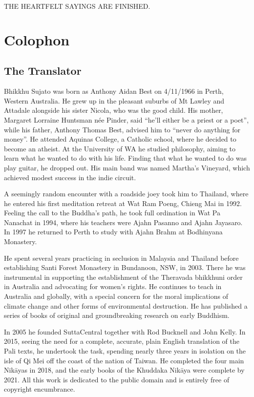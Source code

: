 \documentclass[12pt,openany]{book}%
\newcommand*{\scendbook}[1]{\begin{center}\uppercase{#1}\end{center}}
\let\oldbackmatter\backmatter
\renewcommand{\backmatter}{%
\chapterfont{\setstretch{.85}\normalfont\centering}%
\sectionfont{\setstretch{.85}\Semiboldsubheadfont}%
\oldbackmatter}
\begin{document}
\scendbook{The Heartfelt Sayings are finished. }

%
\backmatter%
%
\chapter*{Colophon}

\section*{The Translator}

Bhikkhu Sujato was born as Anthony Aidan Best on 4/11/1966 in Perth, Western Australia. He grew up in the pleasant suburbs of Mt Lawley and Attadale alongside his sister Nicola, who was the good child. His mother, Margaret Lorraine Huntsman née Pinder, said “he’ll either be a priest or a poet”, while his father, Anthony Thomas Best, advised him to “never do anything for money”. He attended Aquinas College, a Catholic school, where he decided to become an atheist. At the University of WA he studied philosophy, aiming to learn what he wanted to do with his life. Finding that what he wanted to do was play guitar, he dropped out. His main band was named Martha’s Vineyard, which achieved modest success in the indie circuit. 

A seemingly random encounter with a roadside joey took him to Thailand, where he entered his first meditation retreat at Wat Ram Poeng, Chieng Mai in 1992. Feeling the call to the Buddha’s path, he took full ordination in Wat Pa Nanachat in 1994, where his teachers were Ajahn Pasanno and Ajahn Jayasaro. In 1997 he returned to Perth to study with Ajahn Brahm at Bodhinyana Monastery. 

He spent several years practicing in seclusion in Malaysia and Thailand before establishing Santi Forest Monastery in Bundanoon, NSW, in 2003. There he was instrumental in supporting the establishment of the Theravada bhikkhuni order in Australia and advocating for women’s rights. He continues to teach in Australia and globally, with a special concern for the moral implications of climate change and other forms of environmental destruction. He has published a series of books of original and groundbreaking research on early Buddhism. 

In 2005 he founded SuttaCentral together with Rod Bucknell and John Kelly. In 2015, seeing the need for a complete, accurate, plain English translation of the Pali texts, he undertook the task, spending nearly three years in isolation on the isle of Qi Mei off the coast of the nation of Taiwan. He completed the four main \textsanskrit{Nikāyas} in 2018, and the early books of the Khuddaka \textsanskrit{Nikāya} were complete by 2021. All this work is dedicated to the public domain and is entirely free of copyright encumbrance. 
\end{document}
